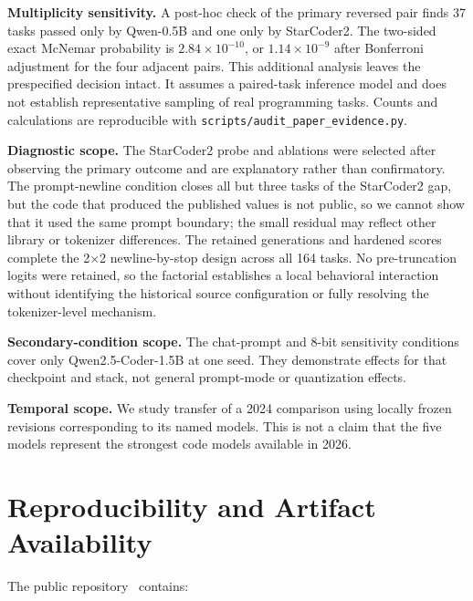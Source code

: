 \documentclass[10pt,twocolumn]{article}
\newcommand{\code}[1]{\texttt{#1}}
\begin{document}
\textbf{Multiplicity sensitivity.} A post-hoc check of the primary reversed
pair finds 37 tasks passed only by Qwen-0.5B and one only by StarCoder2.
The two-sided exact McNemar probability is $2.84\times10^{-10}$, or
$1.14\times10^{-9}$ after Bonferroni adjustment for the four adjacent pairs.
This additional analysis leaves the prespecified decision intact. It assumes
a paired-task inference model and does not establish representative sampling
of real programming tasks. Counts and calculations are reproducible with
\code{scripts/audit\_paper\_evidence.py}.

\textbf{Diagnostic scope.} The StarCoder2 probe and ablations were selected after observing the primary outcome and are explanatory rather than confirmatory. The prompt-newline condition closes all but three tasks of the StarCoder2 gap, but the code that produced the published values is not public, so we cannot show that it used the same prompt boundary; the small residual may reflect other library or tokenizer differences. The retained generations and hardened scores complete the 2$\times$2 newline-by-stop design across all 164 tasks. No pre-truncation logits were retained, so the factorial establishes a local behavioral interaction without identifying the historical source configuration or fully resolving the tokenizer-level mechanism.

\textbf{Secondary-condition scope.} The chat-prompt and 8-bit sensitivity conditions cover only Qwen2.5-Coder-1.5B at one seed. They demonstrate effects for that checkpoint and stack, not general prompt-mode or quantization effects.

\textbf{Temporal scope.} We study transfer of a 2024 comparison using locally frozen revisions corresponding to its named models. This is not a claim that the five models represent the strongest code models available in 2026.

\section{Reproducibility and Artifact Availability}

The public repository~\citep{bassi2026repository} contains:
\end{document}
